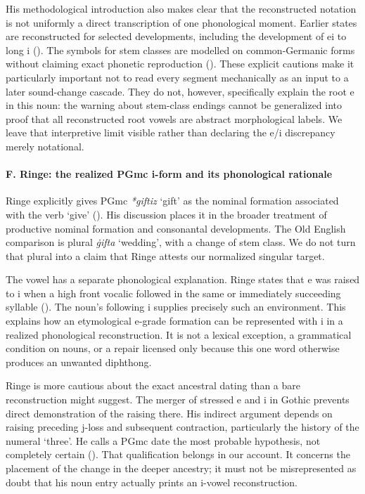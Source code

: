 \documentclass[
  british,
  a4paper,
]{article}
\providecommand{\Recon}[1]{\emph{*#1}}
\begin{document}
His methodological introduction also makes clear that the reconstructed
notation is not uniformly a direct transcription of one phonological
moment. Earlier states are reconstructed for selected developments,
including the development of ei to long i
(). The symbols for stem
classes are modelled on common-Germanic forms without claiming exact
phonetic reproduction (). These explicit cautions make it particularly important not to
read every segment mechanically as an input to a later sound-change
cascade. They do not, however, specifically explain the root e in this
noun: the warning about stem-class endings cannot be generalized into
proof that all reconstructed root vowels are abstract morphological
labels. We leave that interpretive limit visible rather than declaring
the e/i discrepancy merely notational.

\paragraph{F. Ringe: the realized PGmc i-form and its phonological
rationale}\label{f.-ringe-the-realized-pgmc-i-form-and-its-phonological-rationale}

Ringe explicitly gives PGmc \Recon{giftiz} `gift' as the nominal
formation associated with the verb `give'
(). His discussion places it in
the broader treatment of productive nominal formation and consonantal
developments. The Old English comparison is plural \emph{ġifta}
`wedding', with a change of stem class. We do not turn that plural into
a claim that Ringe attests our normalized singular target.

The vowel has a separate phonological explanation. Ringe states that e
was raised to i when a high front vocalic followed in the same or
immediately succeeding syllable (). The noun's following i supplies precisely such an
environment. This explains how an etymological e-grade formation can be
represented with i in a realized phonological reconstruction. It is not
a lexical exception, a grammatical condition on nouns, or a repair
licensed only because this one word otherwise produces an unwanted
diphthong.

Ringe is more cautious about the exact ancestral dating than a bare
reconstruction might suggest. The merger of stressed e and i in Gothic
prevents direct demonstration of the raising there. His indirect
argument depends on raising preceding j-loss and subsequent contraction,
particularly the history of the numeral `three'. He calls a PGmc date
the most probable hypothesis, not completely certain
(). That qualification
belongs in our account. It concerns the placement of the change in the
deeper ancestry; it must not be misrepresented as doubt that his noun
entry actually prints an i-vowel reconstruction.
\end{document}
